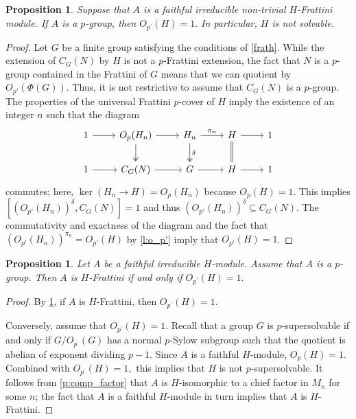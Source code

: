 \documentclass[a4paper,10pt]{amsart}
\theoremstyle{plain}
\newtheorem{proposition}[thm]{Proposition}
\theoremstyle{definition}
\begin{document}
\begin{proposition}\label{p:o_p'_trivial}
    Suppose that $A$ is a faithful irreducible non-trivial $H$-Frattini module. If $A$ is a $p$-group, then $O_{p^\prime}(H)=1.$ In particular, $H$ is not solvable.
\end{proposition}
\begin{proof}
Let $G$ be a finite group satisfying the conditions of \cref{frath}. While the extension of $C_G(N)$ by $H$ is not a $p$-Frattini extension, the fact that $N$ is a $p$-group contained in the Frattini of $G$ means that we can quotient by $O_{p'}(\Phi(G))$. Thus, it is not restrictive to assume that $C_G(N)$ is a $p$-group. The properties of the universal Frattini $p$-cover of $H$ imply the existence of an integer $n$ such that the diagram
\[\begin{tikzcd}
	1 & {O_p(H_n)} & {H_n} & {H} & 1 \\
	1 & C_G(N) & G & {H} & 1
	\arrow[from=1-1, to=1-2]
	\arrow[from=1-2, to=1-3]
	\arrow[two heads, from=1-2, to=2-2]
	\arrow["{\pi_n}",from=1-3, to=1-4]
	\arrow["{\delta}", two heads, from=1-3, to=2-3]
	\arrow[from=1-4, to=1-5]
	\arrow[r,-,double equal sign distance,double, from=1-4, to=2-4]
	\arrow[from=2-1, to=2-2]
	\arrow[from=2-2, to=2-3]
	\arrow[from=2-3, to=2-4]
	\arrow[from=2-4, to=2-5]
\end{tikzcd}\]
commutes; here, $\ker(H_n \to H) = O_p(H_n)$
 because $O_p(H)=1$. This implies $[(O_{p'}(H_n))^\delta,C_G(N)]=1$ and thus $(O_{p'}(H_n))^\delta \subseteq C_G(N)$. The commutativity and exactness of the diagram and the fact that $(O_{p'}(H_n))^{\pi_n}=O_{p'}(H)$ by \cref{l:o_p'} imply that $O_{p'}(H)=1$.
\end{proof}

\begin{proposition}\label{p:frat-mod_o-p'}
Let $A$ be a faithful irreducible $H$-module. Assume that $A$ is a $p$-group. Then $A$ is $H$-Frattini if and only if $O_{p^\prime}(H)=1.$
\end{proposition}
\begin{proof}By \cref{p:o_p'_trivial}, if $A$ is $H$-Frattini, then $O_{p^\prime}(H)=1.$

Conversely, assume that $O_{p^\prime}(H)=1.$ Recall that a group $G$ is $p$-supersolvable if and only if $G/O_{p^\prime}(G)$ has a normal $p$-Sylow subgroup such that the quotient is abelian of exponent dividing $p-1$. Since $A$ is a faithful $H$-module, $O_p(H)=1.$ Combined with $O_{p^\prime}(H)=1,$ this implies that $H$ is not  $p$-supersolvable. It follows from \cref{p:comp_factor} that $A$ is $H$-isomorphic to a chief factor in $M_n$ for some $n$; the fact that $A$ is a faithful $H$-module in turn implies that $A$ is $H$-Frattini.
\end{proof}
\end{document}
